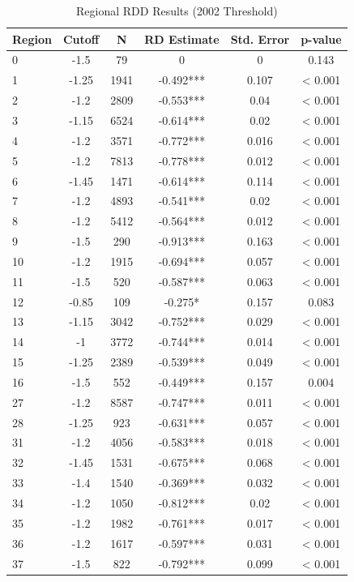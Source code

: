 \begin{table}[!htbp] \centering
\caption{Regional RDD Results (2002 Threshold)}
\label{tab:regional_rdd}
\begin{tabular}{lccccc}
\hline\hline
Region & Cutoff & N & RD Estimate & Std. Error & p-value \\
\hline
0 & -1.5 & 79 & 0 & 0 & 0.143 \\
1 & -1.25 & 1941 & -0.492*** & 0.107 & < 0.001 \\
2 & -1.2 & 2809 & -0.553*** & 0.04 & < 0.001 \\
3 & -1.15 & 6524 & -0.614*** & 0.02 & < 0.001 \\
4 & -1.2 & 3571 & -0.772*** & 0.016 & < 0.001 \\
5 & -1.2 & 7813 & -0.778*** & 0.012 & < 0.001 \\
6 & -1.45 & 1471 & -0.614*** & 0.114 & < 0.001 \\
7 & -1.2 & 4893 & -0.541*** & 0.02 & < 0.001 \\
8 & -1.2 & 5412 & -0.564*** & 0.012 & < 0.001 \\
9 & -1.5 & 290 & -0.913*** & 0.163 & < 0.001 \\
10 & -1.2 & 1915 & -0.694*** & 0.057 & < 0.001 \\
11 & -1.5 & 520 & -0.587*** & 0.063 & < 0.001 \\
12 & -0.85 & 109 & -0.275* & 0.157 & 0.083 \\
13 & -1.15 & 3042 & -0.752*** & 0.029 & < 0.001 \\
14 & -1 & 3772 & -0.744*** & 0.014 & < 0.001 \\
15 & -1.25 & 2389 & -0.539*** & 0.049 & < 0.001 \\
16 & -1.5 & 552 & -0.449*** & 0.157 & 0.004 \\
27 & -1.2 & 8587 & -0.747*** & 0.011 & < 0.001 \\
28 & -1.25 & 923 & -0.631*** & 0.057 & < 0.001 \\
31 & -1.2 & 4056 & -0.583*** & 0.018 & < 0.001 \\
32 & -1.45 & 1531 & -0.675*** & 0.068 & < 0.001 \\
33 & -1.4 & 1540 & -0.369*** & 0.032 & < 0.001 \\
34 & -1.2 & 1050 & -0.812*** & 0.02 & < 0.001 \\
35 & -1.2 & 1982 & -0.761*** & 0.017 & < 0.001 \\
36 & -1.2 & 1617 & -0.597*** & 0.031 & < 0.001 \\
37 & -1.5 & 822 & -0.792*** & 0.099 & < 0.001 \\

\end{tabular}
\end{table}
